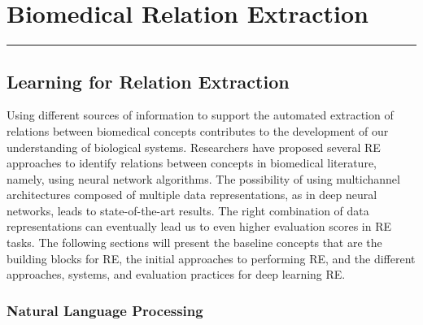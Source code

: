 \hypertarget{2}{}


\chapter[Biomedical Relation Extraction]
{\huge Biomedical Relation Extraction}

\vspace{-1.6cm}

\begingroup
\color{black}
\par\noindent\rule{\textwidth}{0.4pt}
\endgroup


\section{Learning for Relation Extraction}

Using different sources of information to support the automated extraction of relations between biomedical concepts contributes to the development of our understanding of biological systems. Researchers have proposed several RE approaches to identify relations between concepts in biomedical literature, namely, using neural network algorithms. The possibility of using multichannel architectures composed of multiple data representations, as in deep neural networks, leads to state-of-the-art results. The right combination of data representations can eventually lead us to even higher evaluation scores in RE tasks. The following sections will present the baseline concepts that are the building blocks for RE, the initial approaches to performing RE, and the different approaches, systems, and evaluation practices for deep learning RE.  

\hypertarget{2.1.1}{\subsection{Natural Language Processing}}

